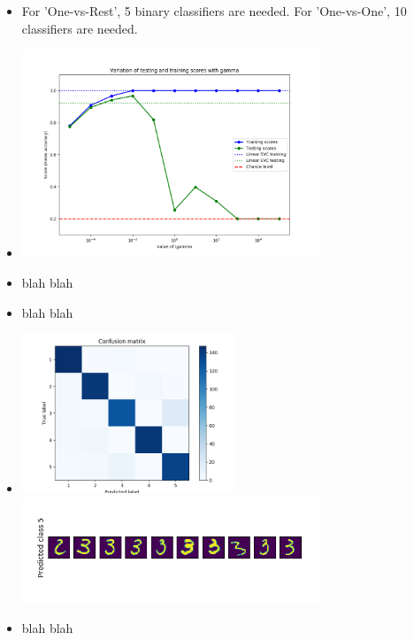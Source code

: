\documentclass[a4paper]{article}
\begin{document}
\begin{itemize}
  \item For 'One-vs-Rest', 5 binary classifiers are needed. For 'One-vs-One', 10 classifiers are needed.
  \item \includegraphics[width=0.7\textwidth]{3_a.png}
  \item blah blah
  \item blah blah
  \item \includegraphics[width=0.5\textwidth]{3_b_cm.png}\\
        \includegraphics[width=0.7\textwidth]{3_b_err.png}
  \item blah blah
\end{itemize}
\end{document}
